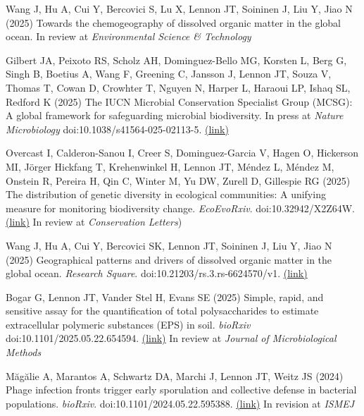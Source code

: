 \documentclass[11pt]{article}
\begin{document}
\begin{etaremune}
\item Wang J, Hu A, Cui Y, Bercovici S, Lu X, Lennon JT, Soininen J, Liu Y, Jiao N (2025) Towards the chemogeography of dissolved organic matter in the global ocean. In review at \textit{Environmental Science \& Technology}

\item Gilbert JA, Peixoto RS, Scholz AH, Dominguez-Bello MG, Korsten L, Berg G, Singh B, Boetius A, Wang F, Greening C, Jansson J, Lennon JT, Souza V, Thomas T, Cowan D, Crowhter T, Nguyen N, Harper L, Haraoui LP, Ishaq SL, Redford K (2025) The IUCN Microbial Conservation Specialist Group (MCSG): A global framework for safeguarding  microbial biodiversity. In press at \textit{Nature Microbiology} doi:10.1038/s41564-025-02113-5. \href{https://www.nature.com/articles/s41564-025-02113-5}{(link)} 

\item Overcast I, Calderon-Sanou I, Creer S, Dominguez-Garcia V, Hagen O, Hickerson MI, Jörger Hickfang T, Krehenwinkel H, Lennon JT, Méndez L, Méndez M, Onstein R, Pereira H, Qin C, Winter M, Yu DW, Zurell D, Gillespie RG (2025) The distribution of genetic diversity in ecological communities: A unifying measure for monitoring biodiversity change. \textit{EcoEvoRxiv}. doi:10.32942/X2Z64W. \href{https://ecoevorxiv.org/repository/view/9169/}{(link)} In review at \textit{Conservation Letters})

\item Wang J, Hu A, Cui Y, Bercovici SK, Lennon JT, Soininen J, Liu Y, Jiao N (2025) Geographical patterns and drivers of dissolved organic matter in the global ocean. \textit{Research Square}. doi:10.21203/rs.3.rs-6624570/v1. \href{https://assets-eu.researchsquare.com/files/rs-6624570/v1/a75822e6-0649-4c95-919e-3ba016f0bc96.pdf?c=1747022553}{(link)}

\item Bogar G, Lennon JT, Vander Stel H, Evans SE (2025) Simple, rapid, and sensitive assay for the quantification of total polysaccharides to estimate extracellular polymeric substances (EPS) in soil. \textit{bioRxiv} doi:10.1101/2025.05.22.654594. \href{https://www.biorxiv.org/content/10.1101/2025.05.22.654594v1}{(link)} In review at \textit{Journal of Microbiological Methods}

\item Măgălie A, Marantos A, Schwartz DA, Marchi J, Lennon JT, Weitz JS (2024) Phage infection fronts trigger early sporulation and collective defense in bacterial populations. \textit{bioRxiv}. doi:10.1101/2024.05.22.595388. \href{https://www.biorxiv.org/content/10.1101/2024.05.22.595388v1.full.pdf}{(link)} In revision at \textit{ISMEJ}


\end{etaremune}
\end{document}

